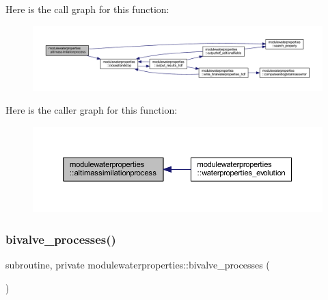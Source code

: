 Here is the call graph for this function\+:\nopagebreak
\begin{figure}[H]
\begin{center}
\leavevmode
\includegraphics[width=350pt]{namespacemodulewaterproperties_a372e37e94ca0415d98cc92c58dc4957b_cgraph}
\end{center}
\end{figure}
Here is the caller graph for this function\+:\nopagebreak
\begin{figure}[H]
\begin{center}
\leavevmode
\includegraphics[width=350pt]{namespacemodulewaterproperties_a372e37e94ca0415d98cc92c58dc4957b_icgraph}
\end{center}
\end{figure}
\mbox{\label{namespacemodulewaterproperties_aa43273d07b646deb6e4c72e757b19fbd}} 
\subsubsection{\texorpdfstring{bivalve\+\_\+processes()}{bivalve\_processes()}}
{\footnotesize\ttfamily subroutine, private modulewaterproperties\+::bivalve\+\_\+processes (\begin{DoxyParamCaption}{ }\end{DoxyParamCaption})\hspace{0.3cm}{\ttfamily [private]}}


